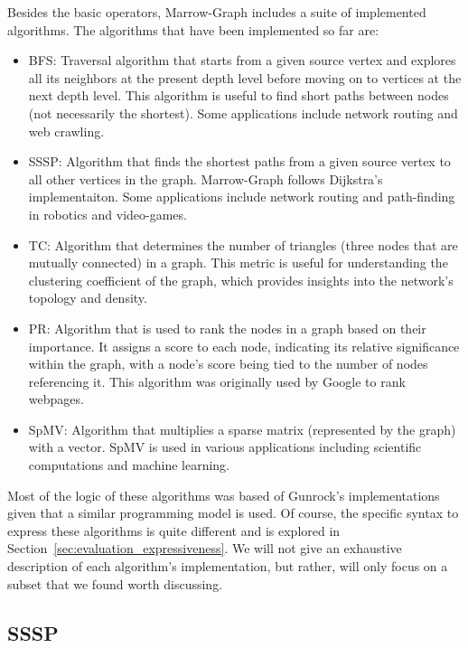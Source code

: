 Besides the basic operators, Marrow-Graph includes a suite of implemented algorithms. The algorithms that have been implemented so far are: 
%
\begin{itemize}
    \item \gls{BFS}: Traversal algorithm that starts from a given source vertex and explores all its neighbors at the present depth level before moving on to vertices at the next depth level. This algorithm is useful to find short paths between nodes (not necessarily the shortest). Some applications include network routing and web crawling.
    \item \gls{SSSP}: Algorithm that finds the shortest paths from a given source vertex to all other vertices in the graph. Marrow-Graph follows Dijkstra's implementaiton. Some applications include network routing and path-finding in robotics and video-games.
    \item \gls{TC}: Algorithm that determines the number of triangles (three nodes that are mutually connected) in a graph. This metric is useful for understanding the clustering coefficient of the graph, which provides insights into the network's topology and density.
    \item \gls{PR}: Algorithm that is used to rank the nodes in a graph based on their importance.  It assigns a score to each node, indicating its relative significance within the graph, with a node's score being tied to the number of nodes referencing it. This algorithm was originally used by Google to rank webpages.
    \item \gls{SpMV}: Algorithm that multiplies a sparse matrix (represented by the graph) with a vector. \gls{SpMV} is used in various applications including scientific computations and machine learning.
\end{itemize}
%
Most of the logic of these algorithms was based of Gunrock's implementations given that a similar programming model is used. Of course, the specific syntax to express these algorithms is quite different and is explored in Section~\ref{sec:evaluation_expressiveness}. We will not give an exhaustive description of each algorithm's implementation, but rather, will only focus on a subset that we found worth discussing.

\subsection{SSSP}

